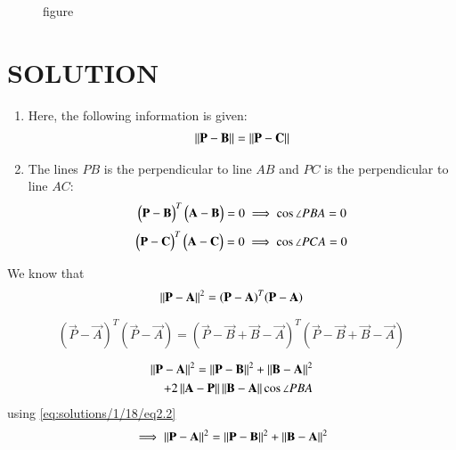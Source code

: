  \begin{figure}[!ht]
\centering
\resizebox{\columnwidth}{!}{}
\caption{figure}
\label{eq:solutions/1/18/fig1}
\end{figure}
\section{SOLUTION}
\begin{enumerate}
    \item Here, the following information is given:
    \begin{align}
    \left\lVert\mathbf{P}-\mathbf{B}\right\rVert=\left\lVert\mathbf{P}-\mathbf{C}\right\rVert \label{eq:solutions/1/18/eq2.1}
    \end{align}
    \item The lines $PB$ is the perpendicular to line $AB$ and 
    $PC$ is the perpendicular to line $AC$:
    \begin{align}
    \begin{pmatrix}\mathbf{P}-\mathbf{B}\end{pmatrix}^T\begin{pmatrix}\mathbf{A}-\mathbf{B}\end{pmatrix}=0 \label{eq:solutions/1/18/eq2.2}
    \implies \cos\angle PBA=0 
    \end{align}
    \begin{align}
    \begin{pmatrix}\mathbf{P}-\mathbf{C}\end{pmatrix}^T\begin{pmatrix}\mathbf{A}-\mathbf{C}\end{pmatrix}=0 \label{eq:solutions/1/18/eq2.3}
    \implies \cos\angle PCA=0 
    \end{align}
\end{enumerate}
We know that 
\begin{align}
\left\lVert\mathbf{P-A}\right\rVert^2=(\mathbf{P}-\mathbf{A})^T(\mathbf{P}-\mathbf{A})
\end{align}
\begin{align}
 \begin{split}
(\vec{P}-\vec{A})^T(\vec{P}-\vec{A})=(\vec{P}-\vec{B}+\vec{B}-\vec{A})^T(\vec{P}-\vec{B}+\vec{B}-\vec{A})
\end{split}
\end{align}
\begin{align}
 \begin{split}
\left\lVert\mathbf{P-A}\right\rVert^2=\left\lVert\mathbf{P-B}\right\rVert^2+\left\lVert\mathbf{B-A}\right\rVert^2\\ 
+2\left\lVert\mathbf{A}-\mathbf{P}\right\rVert\left\lVert\mathbf{B}-\mathbf{A}\right\rVert\cos\angle PBA \\
\end{split}
\end{align}
using \eqref{eq:solutions/1/18/eq2.2}
\begin{align}
 \begin{split}
 \implies \left\lVert\mathbf{P-A}\right\rVert^2=\left\lVert\mathbf{P-B}\right\rVert^2+\left\lVert\mathbf{B-A}\right\rVert^2 \label{eq:solutions/1/18/eq2.4} \\
 \end{split}
\end{align}
